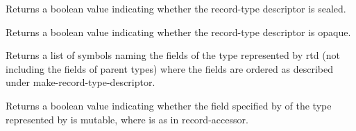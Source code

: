 \begin{entry}{%
}

Returns a boolean value indicating whether the record-type descriptor is
sealed.
\end{entry}

\begin{entry}{%
}
   
Returns a boolean value indicating whether the record-type descriptor is
opaque.
\end{entry}

\begin{entry}{%
}
   
Returns a list of symbols naming the fields of the type represented by rtd
(not including the fields of parent types) where the fields are ordered as
described under {\cf make-record-type-descriptor}.
\end{entry}

\begin{entry}{%
}
   
Returns a boolean value indicating whether the field specified by
 of the type represented by  is mutable, where 
is as in {\cf record-accessor}.
\end{entry}


